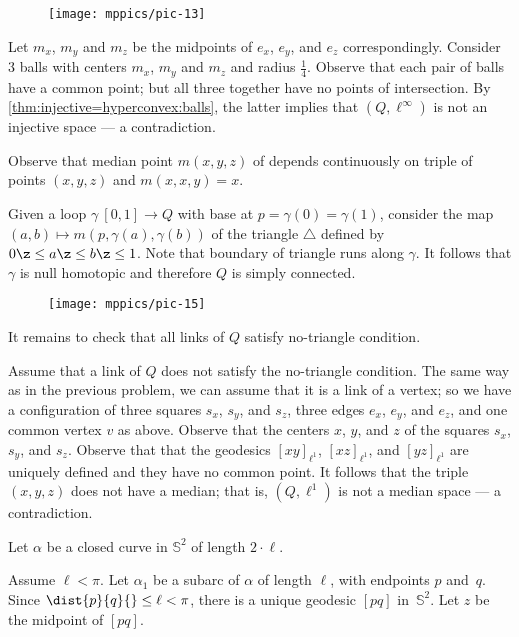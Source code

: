 \begin{wrapfigure}{r}{25 mm}
\vskip-4mm
\centering
\texttt{[image: mppics/pic-13]}
\end{wrapfigure}

Let $m_x$, $m_y$ and $m_z$ be the midpoints of $e_x$, $e_y$, and $e_z$ correspondingly.
Consider 3 balls with centers $m_x$, $m_y$ and $m_z$ and radius $\tfrac14$.
Observe that each pair of balls have a common point;
but all three together have no points of intersection.
By \ref{thm:injective=hyperconvex:balls}, the latter implies that $(Q,\ell^\infty)$ is not an injective space --- a contradiction.


Observe that median point $m(x,y,z)$ of depends continuously on triple of points $(x,y,z)$ and $m(x,x,y)=x$.

Given a loop $\gamma\:[0,1]\to Q$ with base at $p=\gamma(0)=\gamma(1)$,
consider the map $(a,b)\mapsto m(p,\gamma(a),\gamma(b))$ of the triangle $\triangle$ defined by $0\z\le a \z\le b\z\le 1$.
Note that boundary of triangle runs along $\gamma$.
It follows that $\gamma$ is null homotopic and therefore $Q$ is simply connected.

\begin{wrapfigure}{r}{25 mm}
\vskip-4mm
\centering
\texttt{[image: mppics/pic-15]}
\end{wrapfigure}

It remains to check that all links of $Q$ satisfy no-triangle condition.

Assume that a link of $Q$ does not satisfy the no-triangle condition.
The same way as in the previous problem, we can assume that it is a link of a vertex;
so we have a configuration of three squares $s_x$, $s_y$, and $s_z$, 
three edges $e_x$, $e_y$, and $e_z$, and one common vertex $v$ as above.
Observe that the centers $x$, $y$, and $z$ of the squares $s_x$, $s_y$, and $s_z$.
Observe that that the geodesics $[xy]_{\ell^1}$, $[xz]_{\ell^1}$, and $[yz]_{\ell^1}$ are uniquely defined and they have no common point.
It follows that the triple $(x,y,z)$ does not have a median; 
that is, $(Q,\ell^1)$ is not a median space --- a contradiction.


Let $\alpha$ be a closed curve in $\mathbb{S}^2$ of length $2\cdot\ell$.

Assume $\ell<\pi$.
Let $\alpha_1$ be a subarc of $\alpha$ of length $\ell$, with endpoints $p$ and~$q$. 
Since $\dist{p}{q}{}\le\ell<\pi$, there is a unique geodesic $[pq]$ in~$\mathbb{S}^2$.  
Let $z$ be the midpoint of $[pq]$. 

